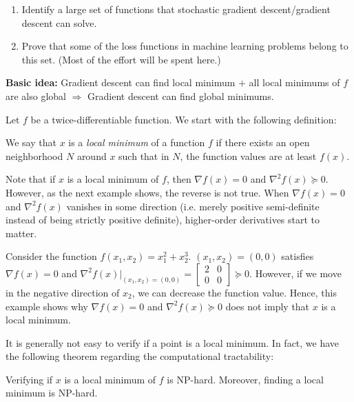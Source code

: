 \begin{enumerate}
    \item Identify a large set of functions that stochastic gradient descent/gradient descent can solve.
    \item Prove that some of the loss functions in machine learning problems belong to this set. (Most of the effort will be spent here.)
\end{enumerate}
\textbf{Basic idea:} Gradient descent can find local minimum $+$ all local minimums of $f$ are also global $\Rightarrow$ Gradient descent can find global minimums.

Let $f$ be a twice-differentiable function. We start with the following definition:
\begin{definition} 
We say that $x$ is a \textit{local minimum} of a function $f$ if there exists an open neighborhood $N$ around $x$ such that in $N$, the function values are at least $f(x)$.
\end{definition}

Note that if $x$ is a local minimum of $f$, then $\nabla f(x) = 0$ and $\nabla^2 f(x) \succeq 0$. However, as the next example shows, the reverse is not true. When $\nabla f(x) = 0$ and $\nabla^2 f(x)$ vanishes in some direction (i.e. merely positive semi-definite instead of being strictly positive definite), higher-order derivatives start to matter.

\begin{example}
\label{lec10:ex:counterexample}
Consider the function $f(x_1, x_2) = x_1^2 + x_2^3$. $(x_1, x_2) = (0, 0)$ satisfies $\nabla f(x) = 0$ and $\nabla^2 f(x)|_{(x_1, x_2) = (0, 0)} = \begin{bmatrix} 2 & 0 \\
0 & 0\end{bmatrix} \succeq 0$. However, if we move in the negative direction of $x_2$, we can decrease the function value. Hence, this example shows why $\nabla f(x) = 0$ and $\nabla^2 f(x) \succeq 0$ does not imply that $x$ is a local minimum.
\end{example}

It is generally not easy to verify if a point is a local minimum. In fact, we have the following theorem regarding the computational tractability:
\begin{theorem}
\label{lec10:thm:np_hard}
Verifying if $x$ is a local minimum of $f$ is NP-hard. Moreover, finding a local minimum is NP-hard.
\end{theorem}

